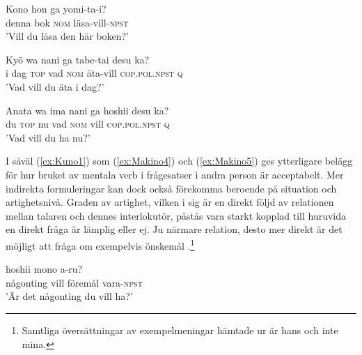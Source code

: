 \documentclass[12pt,a4paper]{article}
\begin{document}
\begin{exe}
\ex
\label{ex:Kuno1}
\gll Kono hon ga yomi-ta-i? \\
     denna bok \textsc{nom} läsa-vill-\textsc{npst} \\
\glt 'Vill du läsa den här boken?'
\hfill \autocite[anpassat från][336]{kuno1973}
\end{exe}

\begin{exe}
\ex
\label{ex:Makino4}
\gll Ky\=o wa nani ga tabe-tai desu ka? \\
     {i dag} \textsc{top} vad \textsc{nom} äta-vill \textsc{cop}.\textsc{pol}.\textsc{npst} \textsc{q} \\
\glt 'Vad vill du äta i dag?'
\hfill \autocite[anpassat från][443]{makino1986}
\end{exe}

\begin{exe}
\ex
\label{ex:Makino5}
\gll Anata wa ima nani ga hoshii desu ka? \\
     du \textsc{top} nu vad \textsc{nom} vill \textsc{cop}.\textsc{pol}.\textsc{npst} \textsc{q} \\
\glt 'Vad vill du ha nu?'
\hfill \autocite[anpassat från][144]{makino1986}
\end{exe}

\noindent
I såväl (\ref{ex:Kuno1}) som (\ref{ex:Makino4}) och (\ref{ex:Makino5}) ges ytterligare belägg för hur bruket av mentala verb i frågesatser i andra person är acceptabelt. Mer indirekta formuleringar kan dock också förekomma beroende på situation och artighetsnivå. Graden av artighet, vilken i sig är en direkt följd av relationen mellan talaren och dennes interlokutör, påstås vara starkt kopplad till huruvida en direkt fråga är lämplig eller ej. Ju närmare relation, desto mer direkt är det möjligt att fråga om exempelvis önskemål \autocite{pettersson1995}.\footnote{Samtliga översättningar av exempelmeningar hämtade ur \textcite{pettersson1995} är hans och inte mina.}

\begin{exe}
\ex
\label{ex:Pettersson1}
 hoshii mono a-ru? \\
     någonting vill föremål vara-\textsc{npst} \\
\glt 'Är det någonting du vill ha?'
\hfill \autocite[anpassat från][87]{pettersson1995}
\end{exe}
\end{document}
